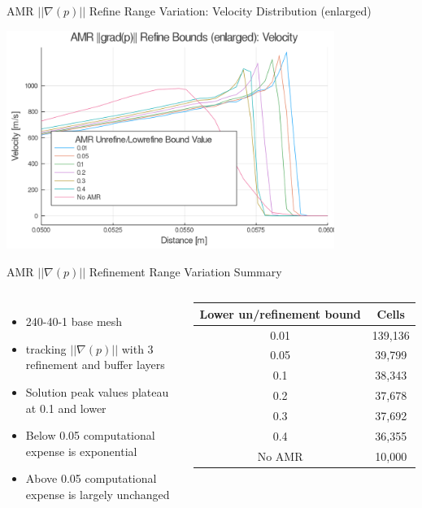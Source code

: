 \begin{frame}{AMR $|| \nabla (p)||$ Refine Range Variation: Velocity Distribution (enlarged)}
\begin{center}
\includegraphics[width=0.8\textwidth]{../figs/amrfigs/amr_refinebounds/ue.png}
\end{center}
\end{frame}

\begin{frame}{AMR $|| \nabla (p)||$ Refinement Range Variation Summary}
\begin{columns}
\begin{itemize}
    \item 240-40-1 base mesh 
    \item tracking $|| \nabla (p)||$ with 3 refinement and buffer layers
    \item Solution peak values plateau at 0.1 and lower
    \item Below 0.05 computational expense is exponential 
    \item Above 0.05 computational expense is largely unchanged
\end{itemize}

\begin{table}[h]
\centering
\begin{tabular}{cc}
Lower un/refinement bound & Cells \\ \hline
0.01 & 139,136 \\
0.05 & 39,799 \\
0.1 & 38,343 \\ 
0.2 & 37,678 \\
0.3 & 37,692 \\ 
0.4 & 36,355 \\
No AMR & 10,000 \\
\end{tabular}
\end{table}
\end{columns}
\end{frame}


